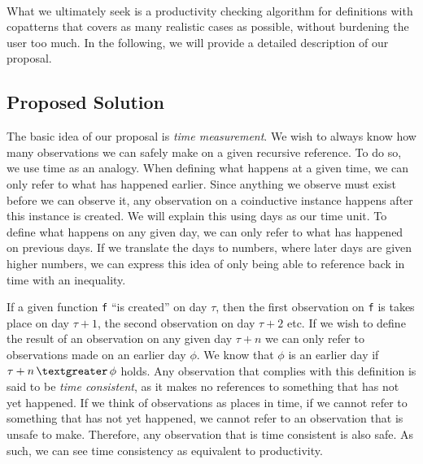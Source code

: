 \paragraph{}
What we ultimately seek is a productivity checking algorithm for definitions with copatterns that covers as many realistic cases as possible, without burdening the user too much. In the following, we will provide a detailed description of our proposal.
\subsection{Proposed Solution}
The basic idea of our proposal is \textit{time measurement}. We wish to always know how many observations we can safely make on a given recursive reference. To do so, we use time as an analogy. When defining what happens at a given time, we can only refer to what has happened earlier. Since anything we observe must exist before we can observe it, any observation on a coinductive instance happens after this instance is created. We will explain this using days as our time unit. To define what happens on any given day, we can only refer to what has happened on previous days. If we translate the days to numbers, where later days are given higher numbers, we can express this idea of only being able to reference back in time with an inequality.

If a given function \texttt{f} ``is created'' on day $\tau$, then the first observation on \texttt{f} is takes place on day $\tau+1$, the second observation on day $\tau+2$ etc. If we wish to define the result of an observation on any given day $\tau+n$ we can only refer to observations made on an earlier day $\phi$. We know that $\phi$ is an earlier day if $\tau+n\, \textgreater \,\phi$ holds. Any observation that complies with this definition is said to be \emph{time consistent}, as it makes no references to something that has not yet happened. If we think of observations as places in time, if we cannot refer to something that has not yet happened, we cannot refer to an observation that is unsafe to make. Therefore, any observation that is time consistent is also safe. As such, we can see time consistency as equivalent to productivity.

